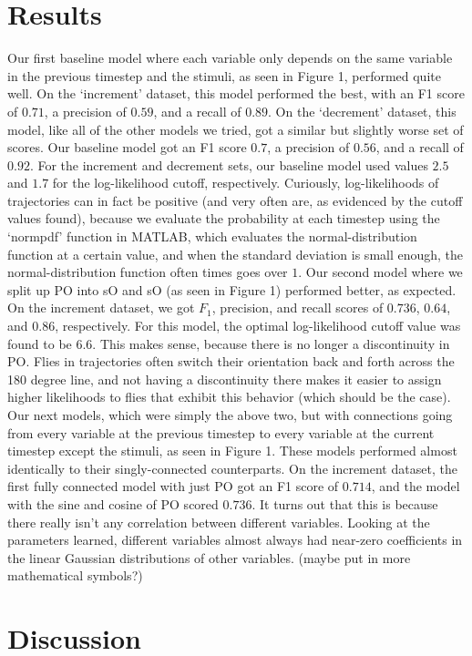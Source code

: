 \documentclass{article} %
\begin{document}
\section{Results}
Our first baseline model where each variable only depends on the same variable in the previous timestep and the stimuli, as seen in Figure 1, performed quite well. On the `increment’ dataset, this model performed the best, with an F1 score of $0.71$, a precision of $0.59$, and a recall of $0.89$. On the ‘decrement’ dataset, this model, like all of the other models we tried, got a similar but slightly worse set of scores. Our baseline model got an F1 score $0.7$, a precision of $0.56$, and a recall of $0.92$. For the increment and decrement sets, our baseline model used values $2.5$ and $1.7$ for the log-likelihood cutoff, respectively. Curiously, log-likelihoods of trajectories can in fact be positive (and very often are, as evidenced by the cutoff values found), because we evaluate the probability at each timestep using the `normpdf’ function in MATLAB, which evaluates the normal-distribution function at a certain value, and when the standard deviation is small enough, the normal-distribution function often times goes over $1$.
Our second model where we split up PO into sO and sO (as seen in Figure 1) performed better, as expected. On the increment dataset, we got $F_1$, precision, and recall scores of $0.736$, $0.64$, and $0.86$, respectively. For this model, the optimal log-likelihood cutoff value was found to be 6.6. This makes sense, because there is no longer a discontinuity in PO. Flies in trajectories often switch their orientation back and forth across the 180 degree line, and not having a discontinuity there makes it easier to assign higher likelihoods to flies that exhibit this behavior (which should be the case).
Our next models, which were simply the above two, but with connections going from every variable at the previous timestep to every variable at the current timestep except the stimuli, as seen in Figure 1. These models performed almost identically to their singly-connected counterparts. On the increment dataset, the first fully connected model with just PO got an F1 score of $0.714$, and the model with the sine and cosine of PO scored $0.736$. It turns out that this is because there really isn’t any correlation between different variables. Looking at the parameters learned, different variables almost always had near-zero coefficients in the linear Gaussian distributions of other variables. (maybe put in more mathematical symbols?)

\section{Discussion}
\end{document}
